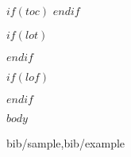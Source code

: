 \documentclass[12pt,final,CPage]{ufthesis}
\begin{document}
\maketitle
\makecopyright

\dedication{$dedication$}

$if(toc)$
\tableofcontents %
$endif$

$if(lot)$
\listoftables %
$endif$

$if(lof)$
\listoffigures %
$endif$



$body$



 {bib/sample,bib/example}


\end{document}
